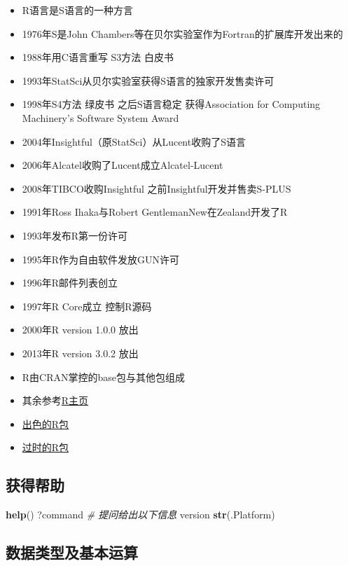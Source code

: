 \documentclass[
]{book}
\newenvironment{Shaded}{\begin{snugshade}}{\end{snugshade}}
\newcommand{\CommentTok}[1]{\textcolor[rgb]{0.56,0.35,0.01}{\textit{#1}}}
\newcommand{\KeywordTok}[1]{\textcolor[rgb]{0.13,0.29,0.53}{\textbf{#1}}}
\newcommand{\NormalTok}[1]{#1}
\providecommand{\tightlist}{%
  \setlength{\itemsep}{0pt}\setlength{\parskip}{0pt}}
\begin{document}
\begin{itemize}
\tightlist
\item
  R语言是S语言的一种方言
\item
  1976年S是John Chambers等在贝尔实验室作为Fortran的扩展库开发出来的
\item
  1988年用C语言重写 S3方法 白皮书
\item
  1993年StatSci从贝尔实验室获得S语言的独家开发售卖许可
\item
  1998年S4方法 绿皮书 之后S语言稳定 获得Association for Computing Machinery's Software System Award
\item
  2004年Insightful（原StatSci）从Lucent收购了S语言
\item
  2006年Alcatel收购了Lucent成立Alcatel-Lucent
\item
  2008年TIBCO收购Insightful 之前Insightful开发并售卖S-PLUS
\item
  1991年Ross Ihaka与Robert GentlemanNew在Zealand开发了R
\item
  1993年发布R第一份许可
\item
  1995年R作为自由软件发放GUN许可
\item
  1996年R邮件列表创立
\item
  1997年R Core成立 控制R源码
\item
  2000年R version 1.0.0 放出
\item
  2013年R version 3.0.2 放出
\item
  R由CRAN掌控的base包与其他包组成
\item
  其余参考\href{http://www.r-project.org/}{R主页}
\item
  \href{https://github.com/qinwf/awesome-R}{出色的R包}
\item
  \href{http://kbroman.org/hipsteR/}{过时的R包}
\end{itemize}

\hypertarget{ux83b7ux5f97ux5e2eux52a9}{%
\subsection{获得帮助}\label{ux83b7ux5f97ux5e2eux52a9}}

\begin{Shaded}
\begin{Highlighting}[]
\KeywordTok{help}\NormalTok{()}
\NormalTok{?command}
\CommentTok{# 提问给出以下信息}
\NormalTok{version}
\KeywordTok{str}\NormalTok{(.Platform)}
\end{Highlighting}
\end{Shaded}

\hypertarget{ux6570ux636eux7c7bux578bux53caux57faux672cux8fd0ux7b97}{%
\subsection{数据类型及基本运算}\label{ux6570ux636eux7c7bux578bux53caux57faux672cux8fd0ux7b97}}
\end{document}
